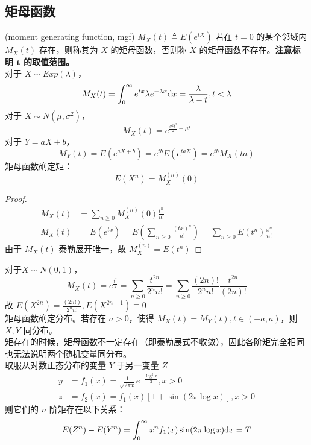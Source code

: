 \documentclass[./main.tex]{subfiles}
\begin{document}
\subsection{矩母函数}
(moment generating function, mgf) $M_X(t)\triangleq E(e^{tX})$ 若在 $t=0$ 的某个邻域内 $M_X(t)$ 存在，则称其为 $X$ 的矩母函数，否则称 $X$ 的矩母函数不存在。\textbf{注意标明 $\bm{t}$ 的取值范围。}\\
对于 $X\sim Exp(\lambda)$，
\begin{equation}
    M_X(t)=\int_0^{\infty}e^{tx}\lambda e^{-\lambda x}\text{d}x=\frac{\lambda}{\lambda -t},t<\lambda
\end{equation}
对于 $X\sim N(\mu,\sigma^2)$，
\begin{equation}
    M_X(t)=e^{\frac{\sigma^2t^2}{2}+\mu t}
\end{equation}
对于 $Y=aX+b$，
\begin{equation}
    M_Y(t)=E(e^{aX+b})=e^{tb}E(e^{taX})=e^{tb}M_X(ta)
\end{equation}
矩母函数确定矩：\begin{equation}E(X^n)=M_X^{(n)}(0)\end{equation}
\begin{proof}
    \begin{align*}
        M_X(t)&=\sum_{n\ge 0}M_X^{(n)}(0)\frac{t^n}{n!}\\
        M_X(t)&=E(e^{tx})=E\left(\sum_{n\ge 0}\frac{(tx)^n}{n!}\right)=\sum_{n\ge 0}E(t^n)\frac{x^n}{n!}
    \end{align*}
    由于 $M_X(t)$ 泰勒展开唯一，故 $M_X^{(n)}=E(t^n)$
\end{proof}
对于$X\sim N(0,1)$，
$$M_X(t)=e^{\frac{t^2}{2}}=\sum_{n\ge 0}\frac{t^{2n}}{2^nn!}=\sum_{n\ge 0}\frac{(2n)!}{2^nn!}\frac{t^{2n}}{(2n)!}$$
故 $E(X^{2n})=\frac{(2n!)}{2^nn!},E(X^{2n-1})\equiv 0$\\
矩母函数确定分布。若存在 $a>0$，使得 $M_X(t)=M_Y(t),t\in(-a,a)$，则 $X,Y$ 同分布。\\
矩存在的时候，矩母函数不一定存在（即泰勒展式不收敛），因此各阶矩完全相同也无法说明两个随机变量同分布。\\
取服从对数正态分布的变量 $Y$ 于另一变量 $Z$
\begin{align*}
    y&=f_1(x)=\frac{1}{\sqrt{2\pi x}}e^{-\frac{\log^2x}{2}},x>0\\
    z&=f_2(x)=f_1(x)[1+\sin(2\pi\log x)],x>0
\end{align*}
则它们的 $n$ 阶矩存在以下关系：
$$E(Z^n)-E(Y^n)=\int_0^{\infty}x^nf_1(x)\sin(2\pi\log x)\text{d}x=T$$
\end{document}

